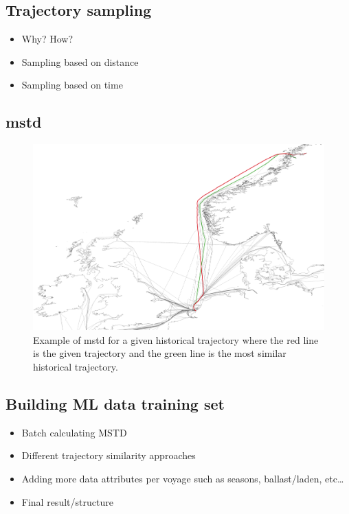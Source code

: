 \subsection{Trajectory sampling}

\begin{itemize}
    \item Why? How?
    \item Sampling based on distance
    \item Sampling based on time
\end{itemize}

\subsection{\acrfull{mstd}}

\begin{figure}[htbp]  %
    \centering
    \includegraphics[width=1.0\textwidth]{figures/mstd}
    \caption{Example of \acrshort{mstd} for a given historical trajectory where the red line is the given trajectory and the green line is the most similar historical trajectory.}
    \label{fig:mstd}
\end{figure}


\subsection{Building ML data training set}

\begin{itemize}
    \item Batch calculating MSTD
    \item Different trajectory similarity approaches
    \item Adding more data attributes per voyage such as seasons, ballast/laden, etc\ldots
    \item Final result/structure
\end{itemize}

